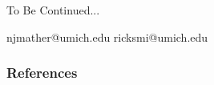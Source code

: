 \documentclass[t,aspectratio=169,11pt]{beamer}
\begin{document}


\begin{frame}[c]
\centering
\Huge{\centerline{To Be Continued...}}
\normalsize njmather{\selectfont @}umich.edu
ricksmi{\selectfont @}umich.edu
\end{frame}



\begin{frame}
\frametitle{References}
\tiny

\end{frame}



\appendix
{}




\begin{frame}{}

\end{frame}
\end{document}

